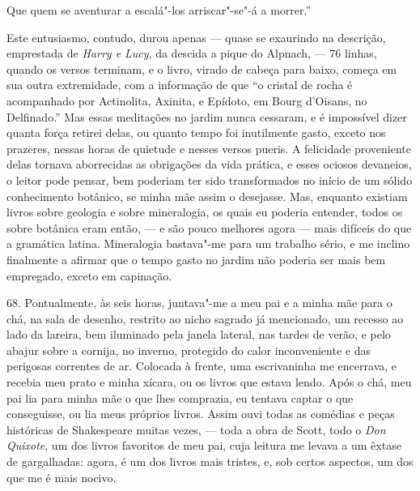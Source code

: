 Que quem se aventurar a escalá"-los arriscar"-se"-á a morrer.''

Este entusiasmo, contudo, durou apenas --- quase se exaurindo na
descrição, emprestada de \emph{Harry e Lucy}, da descida a pique do
Alpnach, --- 76 linhas, quando os versos terminam, e o livro, virado de
cabeça para baixo, começa em sua outra extremidade, com a informação de
que ``o cristal de rocha é acompanhado por Actinolita, Axinita, e
Epídoto, em Bourg d'Oisans, no Delfinado.'' Mas essas meditações no
jardim nunca cessaram, e é impossível dizer quanta força retirei delas,
ou quanto tempo foi inutilmente gasto, exceto nos prazeres, nessas horas
de quietude e nesses versos pueris. A felicidade proveniente delas
tornava aborrecidas as obrigações da vida prática, e esses ociosos
devaneios, o leitor pode pensar, bem poderiam ter sido transformados no
início de um sólido conhecimento botânico, se minha mãe assim o
desejasse. Mas, enquanto existiam livros sobre geologia e sobre
mineralogia, os quais eu poderia entender, todos os sobre botânica eram
então, --- e são pouco melhores agora --- mais difíceis do que a gramática
latina. Mineralogia bastava"-me para um trabalho sério, e me inclino
finalmente a afirmar que o tempo gasto no jardim não poderia ser mais
bem empregado, exceto em capinação.

68. Pontualmente, às seis horas, juntava"-me a meu pai e a minha mãe para
o chá, na sala de desenho, restrito ao nicho sagrado já mencionado, um
recesso ao lado da lareira, bem iluminado pela janela lateral, nas
tardes de verão, e pelo abajur sobre a cornija, no inverno, protegido do
calor inconveniente e das perigosas correntes de ar. Colocada à frente,
uma escrivaninha me encerrava, e recebia meu prato e minha xícara, ou os
livros que estava lendo. Após o chá, meu pai lia para minha mãe o que
lhes comprazia, eu tentava captar o que conseguisse, ou lia meus
próprios livros. Assim ouvi todas as comédias e peças históricas de
Shakespeare muitas vezes, --- toda a obra de Scott, todo o \emph{Don
Quixote}, um dos livros favoritos de meu pai, cuja leitura me levava a
um êxtase de gargalhadas: agora, é um dos livros mais tristes, e, sob
certos aspectos, um dos que me é mais nocivo.

